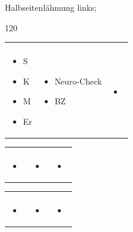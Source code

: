 \documentclass[
ngerman,
paper=a4,
asymmetric,
fontsize=9pt,
draft=false,
parskip=half,
footnotes=multiple,
toc=flat,
]{scrbook}
\newcommand{\DreiSpalten}[3]{
\begin{tabularx}{\linewidth}{XXX}
\TabSub{Anamnese}
&
\TabSub{Untersuchungen}
&
\TabSub{Maßnahmen}
\\
#1
&
#2
&
#3
\end{tabularx}
}
\begin{document}
{\begin{inparadesc}
  \item[Neuro] Halbseitenlähmung links;
  \item[BZ] 120\, 
\end{inparadesc}
}{%
\DreiSpalten
{%
\begin{itemize}
  \item S
  \item K
  \item M
  \item Er
\end{itemize}
}{%
\begin{itemize}
  \item Neuro-Check
  \item BZ
\end{itemize}
}{%
\begin{itemize}
  \item 
\end{itemize}
}
}{%
\DreiSpalten
{%
\begin{itemize}
  \item 
\end{itemize}
}{%
\begin{itemize}
  \item 
\end{itemize}
}{%
\begin{itemize}
  \item 
\end{itemize}
}
}
{}
{%
\DreiSpalten
{%
\begin{itemize}
  \item 
\end{itemize}
}{%
\begin{itemize}
  \item 
\end{itemize}
}{%
\begin{itemize}
  \item 
\end{itemize}
}
}



\end{document}
